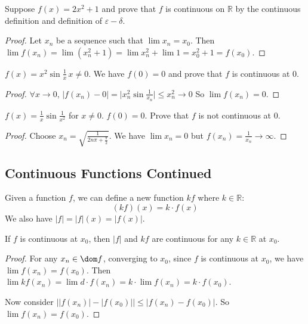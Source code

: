 \documentclass{report}
\begin{document}
\begin{examples}
    \begin{example}
        Suppose $f(x) = 2x^{2} + 1$ and prove that $f$ is continuous on $\mathbb{R}$ by the continuous definition and definition of $\varepsilon-\delta$.
            \begin{proof}
                Let $x_{n}$ be a sequence such that $\lim x_{n} = x_{0}$. Then $\lim f(x_{n}) = \lim (x_{n}^{2} + 1) = \lim x_{n}^{2} + \lim 1 = x_{0}^{2} + 1 = f(x_{0})$.
            \end{proof}
    \end{example}
    \begin{example}
        $f(x) = x^{2} \sin{\frac{1}{x}} \, x \neq 0$. We have $f(0) = 0$ and prove that $f$ is continuous at $0$.
            \begin{proof}
                $\forall x \rightarrow 0$, $\lvert f(x_{n}) - 0 \rvert = \lvert x^{2}_{n}\sin{\frac{1}{x_{n}}} \rvert \leq x_{n}^{2} \rightarrow 0$ So $\lim f(x_{n}) = 0$.
            \end{proof}
    \end{example}
    \begin{example}
        $f(x) = \frac{1}{x}\sin{\frac{1}{x^{2}}}$ for $x \neq 0$. $f(0) = 0$. Prove that $f$ is not continuous at $0$.
            \begin{proof}
                Choose $x_{n} = \sqrt{\frac{1}{2n\pi + \frac{\pi}{2}}}$. We have $\lim x_{n} = 0$ but $f(x_{n}) = \frac{1}{x_{n}} \rightarrow \infty$.
            \end{proof}
    \end{example}
\end{examples}

\begin{topic}
    \section{Continuous Functions Continued}
\end{topic}

Given a function $f$, we can define a new function $kf$ where $k \in \mathbb{R}$:
    \begin{equation*}
        (kf)(x) = k \cdot f(x)
    \end{equation*}
We also have $\lvert f \rvert = \lvert f \rvert(x) = \lvert f(x) \rvert$.

\begin{theorem}{17.3}
    If $f$ is continuous at $x_{0}$, then $\lvert f \rvert$ and $kf$ are continuous for any $k \in \mathbb{R}$ at $x_{0}$.
\end{theorem}
    \begin{proof}
        For any $x_{n} \in \dom f$, converging to $x_{0}$, since $f$ is continuous at $x_{0}$, we have $\lim f(x_{n}) = f(x_{0})$. Then $\lim kf(x_{n}) = \lim d \cdot f(x_{n}) = k \cdot \lim f(x_{n}) = k \cdot f(x_{0})$.

        Now consider $\lvert \lvert f(x_{n}) \rvert - \lvert f(x_{0}) \rvert \rvert \leq \lvert f(x_{n}) - f(x_{0}) \rvert$. So $\lim f(x_{n}) = f(x_{0})$.
    \end{proof}
\end{document}

